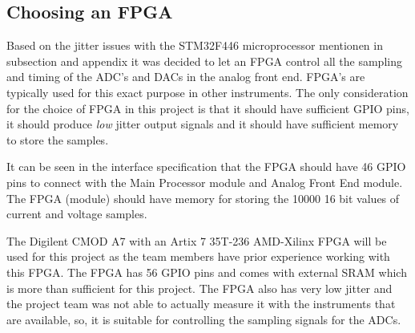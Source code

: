 \subsection{Choosing an FPGA} \label{subsec:ChoosingAnFPGA}

Based on the jitter issues with the STM32F446 microprocessor mentionen in subsection  and appendix  it was decided to let an FPGA control all the sampling and timing of the ADC's and DACs in the analog front end. FPGA's are typically used for this exact purpose in other instruments. The only consideration for the choice of FPGA in this project is that it should have sufficient GPIO pins, it should produce \textit{low} jitter output signals and it should have sufficient memory to store the samples.

It can be seen in the interface specification  that the FPGA should have 46 GPIO pins to connect with the Main Processor module and Analog Front End module. The FPGA (module) should have  memory for storing the 10000 16 bit values of current and voltage samples.

The Digilent CMOD A7\cite{CMOD_A7_AT35T} with an Artix 7 35T-236 AMD-Xilinx FPGA\cite{ARTIX7} will be used for this project as the team members have prior experience working with this FPGA. The FPGA has 56 GPIO pins and comes with  external SRAM which is more than sufficient for this project. The FPGA also has very low jitter and the project team was not able to actually measure it with the instruments that are available, so, it is suitable for controlling the sampling signals for the ADCs.




